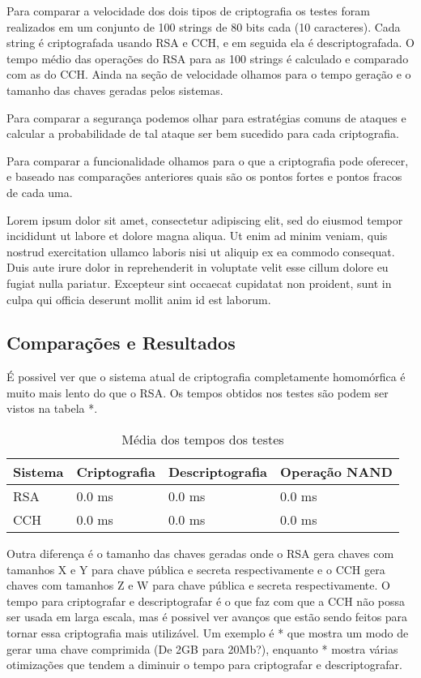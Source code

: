 	Para comparar a velocidade dos dois tipos de criptografia os testes foram realizados em um conjunto de 100 strings de 80 bits cada (10 caracteres). Cada string é criptografada usando RSA e CCH, e em seguida ela é descriptografada. O tempo médio das operações do RSA para as 100 strings é calculado e comparado com as do CCH. Ainda na seção de velocidade olhamos para o tempo geração e o tamanho das chaves geradas pelos sistemas.
	
	Para comparar a segurança podemos olhar para estratégias comuns de ataques e calcular a probabilidade de tal ataque ser bem sucedido para cada criptografia.
	
	Para comparar a funcionalidade olhamos para o que a criptografia pode oferecer, e baseado nas comparações anteriores quais são os pontos fortes e pontos fracos de cada uma.
	
	Lorem ipsum dolor sit amet, consectetur adipiscing elit, sed do eiusmod tempor incididunt ut labore et dolore magna aliqua. Ut enim ad minim veniam, quis nostrud exercitation ullamco laboris nisi ut aliquip ex ea commodo consequat. Duis aute irure dolor in reprehenderit in voluptate velit esse cillum dolore eu fugiat nulla pariatur. Excepteur sint occaecat cupidatat non proident, sunt in culpa qui officia deserunt mollit anim id est laborum.
	
	\subsection{Comparações e Resultados}
	É possivel ver que o sistema atual de criptografia completamente homomórfica é muito mais lento do que o RSA. Os tempos obtidos nos testes são podem ser vistos na tabela *.
	
\begin{table}[!h]
  \centering
  \begin{tabular}{ |l|l|l|l| }
    \hline
      Sistema & Criptografia & Descriptografia & Operação NAND \\
    \hline
      RSA & 0.0 ms & 0.0 ms & 0.0 ms \\
    \hline
      CCH & 0.0 ms & 0.0 ms & 0.0 ms \\
    \hline
  \end{tabular}
  \caption{Média dos tempos dos testes}
  \label{tab:LABEL_TAB_RESULTADOS}
\end{table}

	Outra diferença é o tamanho das chaves geradas onde o RSA gera chaves com tamanhos X e Y para chave pública e secreta respectivamente e o CCH gera chaves com tamanhos Z e W para chave pública e secreta respectivamente. O tempo para criptografar e descriptografar é o que faz com que a CCH não possa ser usada em larga escala, mas é possivel ver avanços que estão sendo feitos para tornar essa criptografia mais utilizável. Um exemplo é * que mostra um modo de gerar uma chave comprimida (De 2GB para 20Mb?), enquanto * mostra várias otimizações que tendem a diminuir o tempo para criptografar e descriptografar.
	
